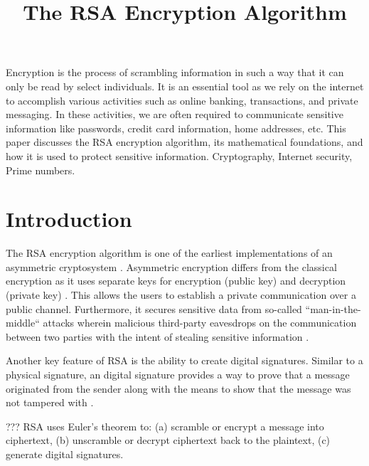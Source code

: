 \documentclass[10pt]{article}
\begin{document}
\noindent



\title{The RSA Encryption Algorithm}


\maketitle


\abstract
Encryption is the process of scrambling information in such a way that it can only be read by select individuals. It is an essential tool as we rely on the internet to accomplish various activities such as online banking, transactions, and private messaging. In these activities, we are often required to communicate sensitive information like passwords, credit card information, home addresses, etc. This paper discusses the RSA encryption algorithm, its mathematical foundations, and how it is used to protect sensitive information.
\keywords
Cryptography, Internet security, Prime numbers.


\section{Introduction}
The RSA encryption algorithm is one of the earliest implementations of an asymmetric cryptosystem \cite{diffie1976new}. Asymmetric encryption differs from the classical encryption as it uses separate keys for encryption (public key) and decryption (private key) \cite{???}. This allows the users to establish a private communication over a public channel. Furthermore, it secures sensitive data from so-called “man-in-the-middle“ attacks wherein malicious third-party eavesdrops on the communication between two parties with the intent of stealing sensitive information \cite{???}.

Another key feature of RSA is the ability to create digital signatures. Similar to a physical signature, an digital signature provides a way to prove that a message originated from the sender along with the means to show that the message was not tampered with \cite{diffie1976new}. 

??? RSA uses Euler’s theorem to: (a) scramble or encrypt a message into ciphertext, (b) unscramble or decrypt ciphertext back to the plaintext, (c) generate digital signatures.
\end{document}
